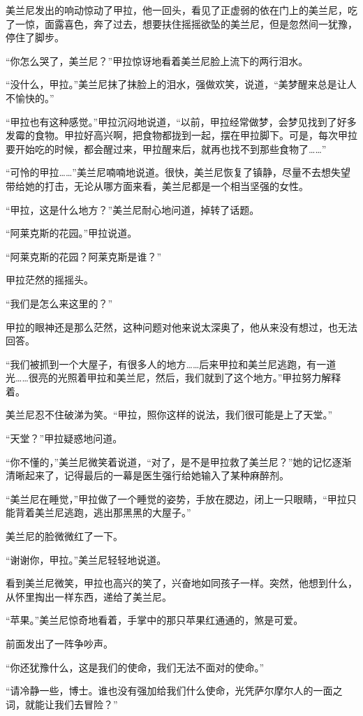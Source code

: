 美兰尼发出的响动惊动了甲拉，他一回头，看见了正虚弱的依在门上的美兰尼，吃了一惊，面露喜色，奔了过去，想要扶住摇摇欲坠的美兰尼，但是忽然间一犹豫，停住了脚步。

“你怎么哭了，美兰尼？”甲拉惊讶地看着美兰尼脸上流下的两行泪水。

“没什么，甲拉。”美兰尼抹了抹脸上的泪水，强做欢笑，说道，“美梦醒来总是让人不愉快的。”

“甲拉也有这种感觉。”甲拉沉闷地说道，“以前，甲拉经常做梦，会梦见找到了好多发霉的食物。甲拉好高兴啊，把食物都拢到一起，摆在甲拉脚下。可是，每次甲拉要开始吃的时候，都会醒过来，甲拉醒来后，就再也找不到那些食物了……”

“可怜的甲拉……”美兰尼喃喃地说道。很快，美兰尼恢复了镇静，尽量不去想失望带给她的打击，无论从哪方面来看，美兰尼都是一个相当坚强的女性。

“甲拉，这是什么地方？”美兰尼耐心地问道，掉转了话题。

“阿莱克斯的花园。”甲拉说道。

“阿莱克斯的花园？阿莱克斯是谁？”

甲拉茫然的摇摇头。

“我们是怎么来这里的？”

甲拉的眼神还是那么茫然，这种问题对他来说太深奥了，他从来没有想过，也无法回答。

“我们被抓到一个大屋子，有很多人的地方……后来甲拉和美兰尼逃跑，有一道光……很亮的光照着甲拉和美兰尼，然后，我们就到了这个地方。”甲拉努力解释着。

美兰尼忍不住破涕为笑。“甲拉，照你这样的说法，我们很可能是上了天堂。”

“天堂？”甲拉疑惑地问道。

“你不懂的，”美兰尼微笑着说道，“对了，是不是甲拉救了美兰尼？”她的记忆逐渐清晰起来了，记得最后的一幕是医生强行给她输入了某种麻醉剂。

“美兰尼在睡觉，”甲拉做了一个睡觉的姿势，手放在腮边，闭上一只眼睛，“甲拉只能背着美兰尼逃跑，逃出那黑黑的大屋子。”

美兰尼的脸微微红了一下。

“谢谢你，甲拉。”美兰尼轻轻地说道。

看到美兰尼微笑，甲拉也高兴的笑了，兴奋地如同孩子一样。突然，他想到什么，从怀里掏出一样东西，递给了美兰尼。

“苹果。”美兰尼惊奇地看着，手掌中的那只苹果红通通的，煞是可爱。

前面发出了一阵争吵声。

“你还犹豫什么，这是我们的使命，我们无法不面对的使命。”

“请冷静一些，博士。谁也没有强加给我们什么使命，光凭萨尔摩尔人的一面之词，就能让我们去冒险？”

